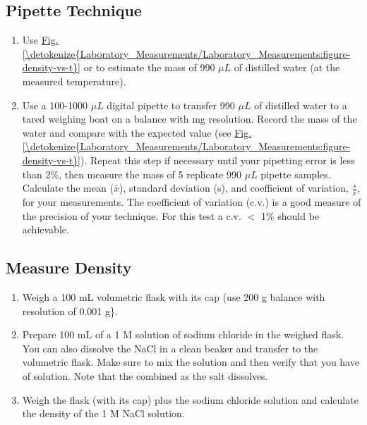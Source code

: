 \documentclass[letterpaper,10pt,english]{sphinxmanual}
\begin{document}
\subsection{Pipette Technique}
\label{\detokenize{Laboratory_Measurements/Laboratory_Measurements:pipette-technique}}\begin{enumerate}
\item {} 
Use \hyperref[\detokenize{Laboratory_Measurements/Laboratory_Measurements:figure-density-vs-t}]{Fig.\@ \ref{\detokenize{Laboratory_Measurements/Laboratory_Measurements:figure-density-vs-t}}} or  to estimate the mass of 990 \(\mu L\) of distilled water (at the measured temperature).

\item {} 
Use a 100-1000 \(\mu L\) digital pipette to transfer 990 \(\mu L\) of distilled water to a tared weighing boat on a balance with mg resolution. Record the mass of the water and compare with the expected value (see \hyperref[\detokenize{Laboratory_Measurements/Laboratory_Measurements:figure-density-vs-t}]{Fig.\@ \ref{\detokenize{Laboratory_Measurements/Laboratory_Measurements:figure-density-vs-t}}}). Repeat this step if necessary until your pipetting error is less than 2\%, then measure the mass of 5 replicate 990 \(\mu L\) pipette samples. Calculate the mean (\(\bar{x}\)), standard deviation (s), and coefficient of variation, \(\frac{s}{\bar{x}}\), for your measurements. The coefficient of variation (c.v.) is a good measure of the precision of your technique. For this test a c.v. \(\mathrm{<}\) 1\% should be achievable.

\end{enumerate}


\subsection{Measure Density}
\label{\detokenize{Laboratory_Measurements/Laboratory_Measurements:measure-density}}\begin{enumerate}
\item {} 
Weigh a 100 mL volumetric flask with its cap (use 200 g balance with resolution of 0.001 g\}.

\item {} 
Prepare 100 mL of a 1 M solution of sodium chloride in the weighed flask. You can also dissolve the NaCl in a clean beaker and transfer to the volumetric flask.  Make sure to mix the solution and then verify that you have  of solution. Note that the combined  as the salt dissolves.

\item {} 
Weigh the flask (with its cap) plus the sodium chloride solution and calculate the density of the 1 M NaCl solution.

\end{enumerate}
\end{document}
